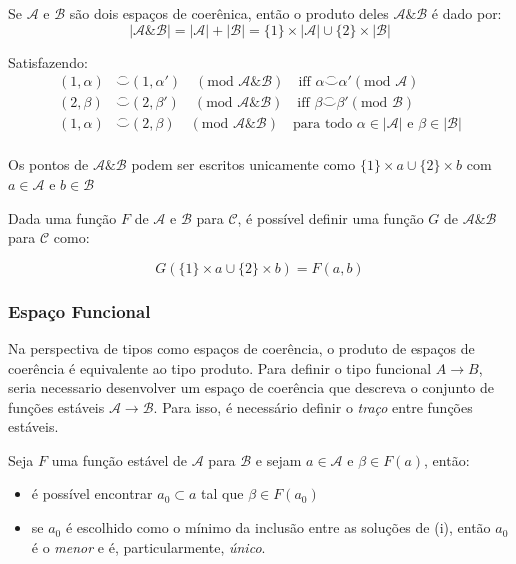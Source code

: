 \documentclass[../main.tex]{subfiles}
\begin{document}
\begin{definition}
    Se $\mathcal{A}$ e $\mathcal{B}$ são dois espaços de coerênica, então o produto deles $\mathcal{A} \& \mathcal{B}$ é dado por:  
    $$| \mathcal{A} \& \mathcal{B} | = |\mathcal{A}| + |\mathcal{B}| = \{1\} \times |\mathcal{A}| \cup \{2\} \times |\mathcal{B}|$$

    Satisfazendo:
    \begin{align*}
        (1, \alpha) & \stackrel{\frown}{\smile} (1, \alpha') \quad (\text{mod } \mathcal{A} \& \mathcal{B}) \quad \text{iff } \alpha \stackrel{\frown}{\smile} \alpha' (\text{mod } \mathcal{A}) \\
        (2, \beta) & \stackrel{\frown}{\smile} (2, \beta') \quad (\text{mod } \mathcal{A} \& \mathcal{B}) \quad \text{iff } \beta \stackrel{\frown}{\smile} \beta' (\text{mod } \mathcal{B}) \\
        (1, \alpha) & \stackrel{\frown}{\smile} (2, \beta) \quad (\text{mod } \mathcal{A} \& \mathcal{B}) \quad \text{para todo } \alpha \in |\mathcal{A}| \text{ e }  \beta \in |\mathcal{B}|  \\
    \end{align*}
\end{definition}

Os pontos de $\mathcal{A} \& \mathcal{B}$ podem ser escritos unicamente como $\{1\} \times a \cup \{2\} \times b$ com $a \in \mathcal{A}$ e $b \in \mathcal{B}$

Dada uma função $F$ de $\mathcal{A}$ e $\mathcal{B}$ para $\mathcal{C}$, é possível definir uma função $G$ de $\mathcal{A} \& \mathcal{B}$ para $\mathcal{C}$ como:

$$G(\{1\} \times a \cup \{2\} \times b) = F(a, b)$$

\subsubsection{Espaço Funcional}

Na perspectiva de tipos como espaços de coerência, o produto de espaços de coerência é equivalente ao tipo produto. Para definir o tipo funcional $A \to B$, seria necessario desenvolver um espaço de coerência que descreva o conjunto de funções estáveis $\mathcal{A} \to \mathcal{B}$. Para isso, é necessário definir o \emph{traço} entre funções estáveis.

\begin{lemma}
    Seja $F$ uma função estável de $\mathcal{A}$ para $\mathcal{B}$ e sejam $a \in \mathcal{A}$ e $\beta \in F(a)$, então:
    \begin{itemize}
        \item é possível encontrar $a_0 \subset a$ tal que $\beta \in F(a_0)$
        \item se $a_0$ é escolhido como o mínimo da inclusão entre as soluções de (i), então $a_0$ é o \emph{menor} e é, particularmente, \emph{único}.
    \end{itemize}
\end{lemma}
\end{document}
